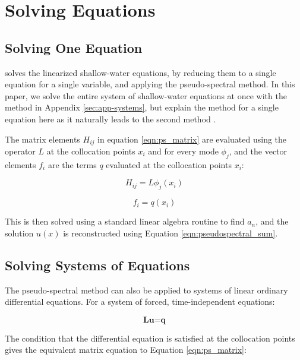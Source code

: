 \section{Solving Equations}


\subsection*{Solving One Equation}

 \citet{boyd1978shearI} solves the linearized shallow-water equations, by reducing them to a single equation for a single variable, and applying the pseudo-spectral method. In this paper, we solve the entire system of shallow-water equations at once with the method in Appendix \ref{sec:app-systems}, but explain the method for a single equation here as it naturally leads to the second method \citep{boyd2000spectral}.

The matrix elements $H_{ij}$ in equation \ref{eqn:ps_matrix} are evaluated using the operator $L$ at the collocation points $x_{i}$ and for every mode $\phi_{j}$, and the vector elements $f_{i}$ are the terms $q$ evaluated at the collocation points $x_{i}$:

\begin{equation}\label{eqn:ps_H}
  H_{ij} = L \phi_{j}(x_{i})
\end{equation}

\begin{equation}
  f_{i} = q(x_{i})
\end{equation}


This is then solved using a standard linear algebra routine to find $a_{n}$, and the solution $u(x)$ is reconstructed using Equation \ref{eqn:pseudospectral_sum}.


\subsection*{Solving Systems of Equations}\label{sec:app-systems}

The pseudo-spectral method can also be applied to systems of linear ordinary differential equations. For a system of forced, time-independent equations:

\begin{equation}
  \textbf{L} \textbf{u} = \textbf{q}
\end{equation}


The condition that the differential equation is satisfied at the collocation points gives the equivalent matrix equation to Equation \ref{eqn:ps_matrix}:

